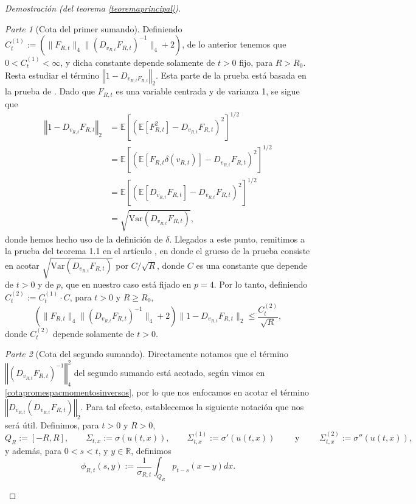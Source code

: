 \documentclass[letterpaper,twoside,12pt]{book}
\newcommand{\R}{\mathbb{R}}
\newcommand{\E}{\mathbb{E}}
\newcommand{\1}{\mathds{1}}
\newcommand{\norm}[1]{\left\Vert #1 \right\Vert}
\theoremstyle{definition}
\theoremstyle{definition}
\theoremstyle{remark}
\newtheorem{proofpart}{Parte}
\theoremstyle{definition}
\theoremstyle{definition}
\theoremstyle{definition}
\theoremstyle{definition}
\theoremstyle{definition}
\begin{document}
\begin{proof}[Demostración (del teorema \ref{teoremaprincipal})]
\begin{proofpart}[Cota del primer sumando]
Definiendo $C_{t}^{(1)}:=\left(\|F_{R,t}\|_4\|\left(D_{v_{R,t}}F_{R,t}\right)^{-1}\|_4+2\right)$, de lo anterior tenemos que $0<C_{t}^{(1)}<\infty$, y dicha constante depende solamente de $t>0$ fijo, para $R>R_0$. Resta estudiar el término $\norm{1-D_{v_{R,t}F_{R,t}}}_2$. Esta parte de la prueba está basada en la prueba de \cite[teorema 1.1]{HUANG20207170}. Dado que $F_{R,t}$ es una variable centrada y de varianza 1, se sigue que 
\begin{align*}
   \norm{1-D_{v_{R,t}}F_{R,t}}_2&=\E\left[(\E\left[F_{R,t}^2\right]-D_{v_{R,t}}F_{R,t})^2\right]^{1/2}\\
   &=\E\left[(\E\left[F_{R,t}\delta(v_{R,t})\right]-D_{v_{R,t}}F_{R,t})^2\right]^{1/2}\\
   &=\E\left[(\E\left[D_{v_{R,t}}F_{R,t}\right]-D_{v_{R,t}}F_{R,t})^2\right]^{1/2}\\
   &=\sqrt{\text{Var}\left(D_{v_{R,t}}F_{R,t}\right)},
\end{align*}
donde hemos hecho uso de la definición de $\delta$. Llegados a este punto, remitimos a la prueba del teorema 1.1 en el artículo \cite{HUANG20207170}, en donde el grueso de la prueba consiste en acotar $\sqrt{\text{Var}\left(D_{v_{R,t}}F_{R,t}\right)}$ por $C/\sqrt{R}$, donde $C$ es una constante que depende de $t>0$ y de $p$, que en nuestro caso está fijado en $p=4$. Por lo tanto, definiendo $C_{t}^{(2)}:=C_{t}^{(1)}\cdot C$, para $t>0$ y $R\geq R_0$,
\begin{equation}\label{cotaprimersumando}
   \left(\|F_{R,t}\|_4\|\left(D_{v_{R,t}}F_{R,t}\right)^{-1}\|_4+2\right)\|1-D_{v_{R,t}}F_{R,t}\|_2\leq \frac{C_{t}^{(2)}}{\sqrt{R}},
\end{equation}
donde $C_{t}^{(2)}$ depende solamente de $t>0$.
\end{proofpart}
\begin{proofpart}[Cota del segundo sumando]
Directamente notamos que el término $\norm{(D_{v_{R,t}}F_{R,t})^{-1}}^2_4$ del segundo sumando está acotado, según vimos en \eqref{cotapromespacmomentosinversos}, por lo que nos enfocamos en acotar el término $\norm{D_{v_{R,t}}(D_{v_{R,t}}F_{R,t})}_2$. 
Para tal efecto, establecemos la siguiente notación que nos será útil. Definimos, para $t>0$ y $R>0$, 
\[
Q_R:=[-R,R], \qquad \Sigma_{t,x}:=\sigma(u(t,x)), \qquad \Sigma_{t,x}^{(1)}:=\sigma'(u(t,x)) \qquad \text{ y } \qquad \Sigma_{t,x}^{(2)}:=\sigma''(u(t,x)),
\]
y además, para $0<s<t$, y $y\in \R$, definimos  
\begin{equation}\label{defnotacionphi}
   \phi_{R,t}(s,y):=\frac{1}{\sigma_{R,t}}\int_{Q_R}p_{t-s}(x-y)dx.
\end{equation}


\end{proofpart}
\end{proof}
\end{document}
